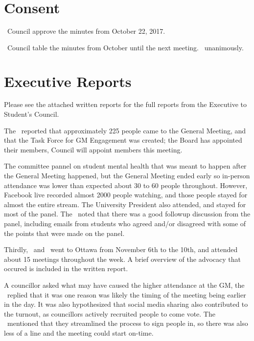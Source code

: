 \section*{Consent}

\begin{motion}
    \birt\ Council approve the minutes from October 22, 2017.

    \begin{motion}
        \birt\ Council table the minutes from October until the next meeting.
        \movers{\tristan}{\brian}
        \carries\ unanimously.
    \end{motion}
\end{motion}

\section*{Executive Reports}

Please see the attached written reports for the full reports from the Executive
to Student's Council. 

\begin{information}
    The \pres\ reported that approximately 225 people came to the General 
    Meeting, and that the Task Force for GM Engagement was created; the Board
    has appointed their members, Council will appoint members this meeting.
    
    The committee pannel on student mental health that was meant to happen
    after the General Meeting happened, but the General Meeting ended early so 
    in-person attendance was lower than expected \emdash about 30 to 60 
    people throughout. However, Facebook live recorded almost 2000 people 
    watching, and those people stayed for almost the entire stream. The
    University President also attended, and stayed for most of the
    panel. The \pres\ noted that there was a good followup discussion from the 
    panel, including emails from students who agreed and/or disagreed with some
    of the points that were made on the panel.

    Thirdly, \antonio\ and \andrewc\ went to Ottawa from November 6th to the 
    10th, and attended about 15 meetings throughout the week. A brief overview
    of the advocacy that occured is included in the written report. 

    A councillor asked what may have caused the higher attendance at the GM,
    the \pres\ replied that it was one reason was likely the timing of the
    meeting being earlier in the day. It was also hypothesized that social
    media sharing also contributed to the turnout, as councillors actively
    recruited people to come vote. The \vpof\ mentioned that they streamlined
    the process to sign people in, so there was also less of a line and the
    meeting could start on-time.

\end{information}

